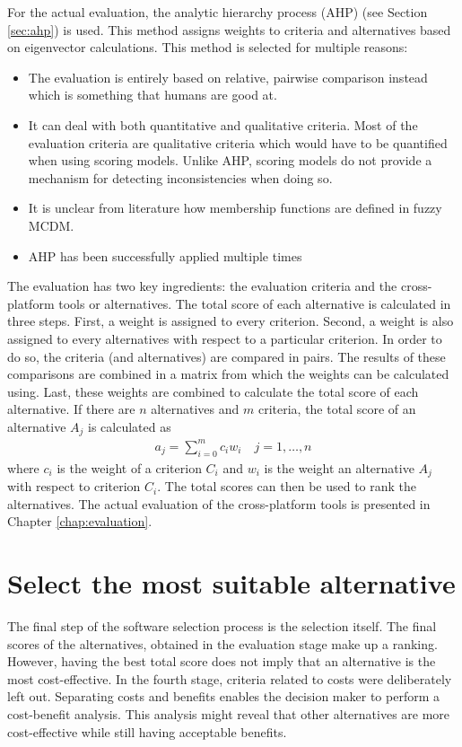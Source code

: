 For the actual evaluation, the analytic hierarchy process (AHP) \cite{Saaty:1980} (see Section \ref{sec:ahp}) is used. This method assigns weights to criteria and alternatives based on eigenvector calculations. This method is selected for multiple reasons:
\begin{itemize}
    \item The evaluation is entirely based on relative, pairwise comparison instead which is something that humans are good at.
    \item It can deal with both quantitative and qualitative criteria. Most of the evaluation criteria are qualitative criteria which would have to be quantified when using scoring models. Unlike AHP, scoring models do not provide a mechanism for detecting inconsistencies when doing so.
    \item It is unclear from literature how membership functions are defined in fuzzy MCDM.
    \item AHP has been successfully applied multiple times \cite{Jadhav:2009, Jadhav:2011}
\end{itemize}

The evaluation has two key ingredients: the evaluation criteria and the cross-platform tools or alternatives. The total score of each alternative is calculated in three steps. First, a weight is assigned to every criterion. Second, a weight is also assigned to every alternatives with respect to a particular criterion. In order to do so, the criteria (and alternatives) are compared in pairs. The results of these comparisons are combined in a matrix from which the weights can be calculated using. Last, these weights are combined to calculate the total score of each alternative. If there are $n$ alternatives and $m$ criteria, the total score of an alternative $A_j$ is calculated as
\begin{gather}
    a_j = \sum_{i = 0}^{m} c_i w_i \quad j = 1, \ldots, n
\end{gather}
where $c_i$ is the weight of a criterion $C_i$ and $w_i$ is the weight an alternative $A_j$ with respect to criterion $C_i$. The total scores can then be used to rank the alternatives. The actual evaluation of the cross-platform tools is presented in Chapter \ref{chap:evaluation}. 

\section{Select the most suitable alternative}

The final step of the software selection process is the selection itself. The final scores of the alternatives, obtained in the evaluation stage make up a ranking. However, having the best total score does not imply that an alternative is the most cost-effective. In the fourth stage, criteria related to costs were deliberately left out. Separating costs and benefits enables the decision maker to perform a cost-benefit analysis. This analysis might reveal that other alternatives are more cost-effective while still having acceptable benefits.







